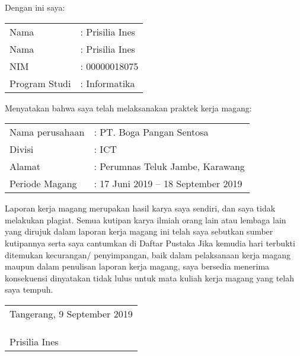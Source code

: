 
\noindent Dengan ini saya:
\begin{flushleft}
    \begin{tabular}{ll}
    Nama          & : Prisilia Ines \\
    Nama          & : Prisilia Ines \\
    NIM           & : 00000018075   \\
    Program Studi & : Informatika  
    \end{tabular}
\end{flushleft}
\noindent Menyatakan bahwa saya telah melaksanakan praktek kerja magang:
\begin{flushleft}    
    \begin{tabular}{ll}
    Nama perusahaan & : PT. Boga Pangan Sentosa          \\
    Divisi          & : ICT                              \\
    Alamat          & : Perumnas Teluk Jambe, Karawang   \\
    Periode Magang  & : 17 Juni 2019 – 18 September 2019
    \end{tabular}
\end{flushleft}
    \noindent Laporan kerja magang merupakan hasil karya saya sendiri, dan saya tidak melakukan plagiat. 
    Semua kutipan karya ilmiah orang lain atau lembaga lain yang dirujuk dalam laporan 
    kerja magang ini telah saya sebutkan sumber kutipannya serta saya cantumkan di Daftar Pustaka
Jika kemudia hari terbukti ditemukan kecurangan/ penyimpangan, baik dalam pelaksanaan kerja 
magang maupun dalam penulisan laporan kerja magang, saya bersedia menerima konsekuensi dinyatakan 
tidak lulus untuk mata kuliah kerja magang yang telah saya tempuh.\\

\noindent \begin{tabular}{l}
Tangerang, 9 September 2019 \\
                            \\
                            \\
                            \\
Prisilia Ines              
\end{tabular}